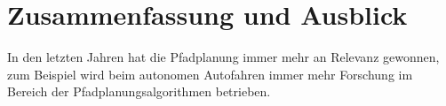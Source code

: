 \chapter{Zusammenfassung und Ausblick}
\label{Zusammenfassung und Ausblick}
In den letzten Jahren hat die Pfadplanung immer mehr an Relevanz gewonnen, zum Beispiel wird beim autonomen Autofahren immer mehr Forschung 
im Bereich der Pfadplanungsalgorithmen betrieben. \cite{Karur:21}
\noindent \\
